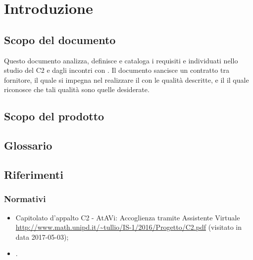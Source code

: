 \section{Introduzione}
 \subsection{Scopo del documento}
 Questo documento analizza, definisce e cataloga i requisiti e  individuati nello studio del  C2 e dagli incontri con \PROPONENTE. 
 Il documento sancisce un contratto tra fornitore, il quale si impegna nel realizzare il  con le qualità descritte,  e il  il quale riconosce che tali qualità sono quelle desiderate. 
 \subsection{Scopo del prodotto}
 \SCOPO
 \subsection{Glossario}
 \GLOSSARIO
 \subsection{Riferimenti}
  \subsubsection{Normativi}
  \begin{itemize}
  	\item Capitolato d'appalto C2 - AtAVi: Accoglienza tramite Assistente Virtuale \\
  	\url{http://www.math.unipd.it/~tullio/IS-1/2016/Progetto/C2.pdf} (visitato in data 2017-05-03);
    \item \NPdoc.
  \end{itemize}
